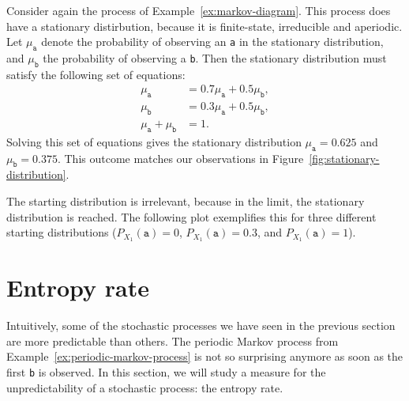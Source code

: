 \begin{example}
Consider again the process of Example~\ref{ex:markov-diagram}. This process does have a stationary distirbution, because it is finite-state, irreducible and aperiodic. Let $\mu_{\texttt{a}}$ denote the probability of observing an \texttt{a} in the stationary distribution, and $\mu_{\texttt{b}}$ the probability of observing a \texttt{b}. Then the stationary distribution must satisfy the following set of equations:
\begin{align*}
\mu_{\texttt{a}} &= 0.7 \mu_{\texttt{a}} + 0.5 \mu_{\texttt{b}},\\
\mu_{\texttt{b}} &= 0.3 \mu_{\texttt{a}} + 0.5 \mu_{\texttt{b}},\\
\mu_{\texttt{a}} + \mu_{\texttt{b}} &= 1.
\end{align*}
Solving this set of equations gives the stationary distribution $\mu_{\texttt{a}} = 0.625$ and $\mu_{\texttt{b}} = 0.375$. This outcome matches our observations in Figure~\ref{fig:stationary-distribution}.

The starting distribution is irrelevant, because in the limit, the stationary distribution is reached. The following plot exemplifies this for three different starting distributions ($P_{X_1}(\texttt{a}) = 0$, $P_{X_1}(\texttt{a}) = 0.3$, and $P_{X_1}(\texttt{a}) = 1$).

\begin{center}
\end{center}
\end{example}

\section{Entropy rate}
Intuitively, some of the stochastic processes we have seen in the previous section are more predictable than others. The periodic Markov process from Example~\ref{ex:periodic-markov-process} is not so surprising anymore as soon as the first \texttt{b} is observed. In this section, we will study a measure for the unpredictability of a stochastic process: the entropy rate.

